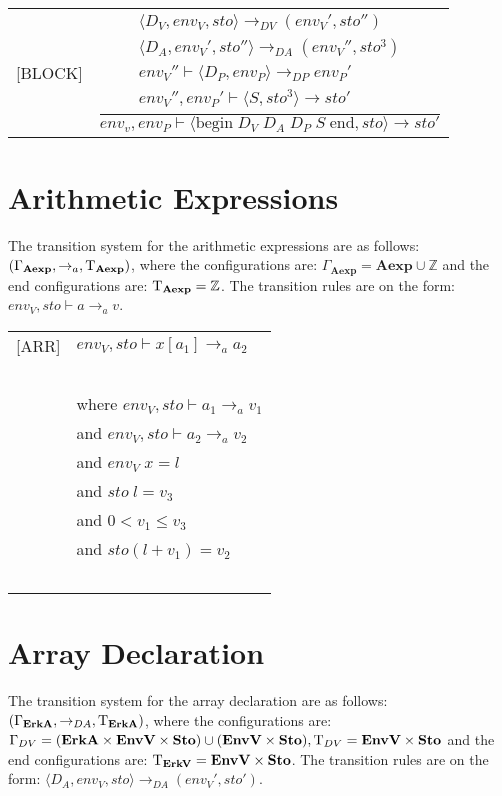\begin{table}[H]
\begin{tabular}{l l}
[BLOCK] & $\dfrac{\begin{matrix} \langle D_V, env_V, sto \rangle \rightarrow_{DV} (env_V', sto'') \\ \langle D_A, env_V', sto'' \rangle \rightarrow_{DA} (env_V'', sto^{3}) \\ env_V'' \vdash \langle D_P, env_P \rangle \rightarrow_{DP} env_P' \\ env_V'', env_P' \vdash \langle S, sto^{3} \rangle \rightarrow sto' \end{matrix}}{env_v, env_P \vdash \langle \text{begin} \; D_V \; D_A \; D_P \; S \; \text{end}, sto \rangle \rightarrow sto'}$
\end{tabular}
\end{table}

\section{Arithmetic Expressions}
The transition system for the arithmetic expressions are as follows: $(\Gamma_{\mathbf{Aexp}}, \rightarrow_a, \mathrm{T}_{\mathbf{Aexp}})$, where the configurations are: $\Gamma_{\mathbf{Aexp}} = \textbf{Aexp} \cup \mathbb{Z}$ and the end configurations are: $\mathrm{T}_{\mathbf{Aexp}} = \mathbb{Z}$. 
The transition rules are on the form: $env_V, sto \vdash a \rightarrow_a v$.

\begin{table}[H]
\begin{tabular}{l l}
[ARR] & $env_V, sto \vdash x[a_1] \rightarrow_a a_2$ \\
~ & ~ \\
~ & \indent\indent where $env_V, sto \vdash a_1 \rightarrow_a v_1$ \\
~ & \indent\indent and $env_V, sto \vdash a_2 \rightarrow_a v_2$ \\
~ & \indent\indent and $env_V \; x = l$ \\
~ & \indent\indent and $sto \; l = v_3$ \\
~ & \indent\indent and $0 < v_1 \leq v_3$ \\
~ & \indent\indent and $sto(l + v_1) = v_2$ \\
~ & ~\\
\end{tabular}
\end{table}

\section{Array Declaration}
The transition system for the array declaration are as follows: $(\Gamma_{\mathbf{ErkA}}, \rightarrow_{DA}, \mathrm{T}_{\mathbf{ErkA}})$, where the configurations are: $\Gamma_{DV} = (\textbf{ErkA} \times \textbf{EnvV} \times \textbf{Sto}) \cup (\textbf{EnvV} \times \textbf{Sto}), \mathrm{T}_{DV} = \textbf{EnvV} \times \textbf{Sto}$ and the end configurations are: $ \mathrm{T}_{\mathbf{ErkV}} = \textbf{EnvV} \times \textbf{Sto}$. 
The transition rules are on the form: $\langle D_A, env_V, sto \rangle \rightarrow_{DA} (env_V', sto')$.

